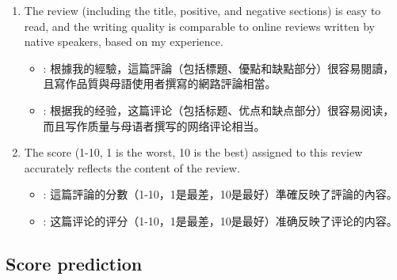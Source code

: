 \begin{enumerate}
    \item The review (including the title, positive, and negative sections) is easy to read, and the writing quality is comparable to online reviews written by native speakers, based on my experience.

    \begin{itemize}[leftmargin=*]
        \item \begin{CJK*}{UTF8}{bsmi} \twChinese:
        根據我的經驗，這篇評論（包括標題、優點和缺點部分）很容易閱讀，且寫作品質與母語使用者撰寫的網路評論相當。\end{CJK*}
    
        \item \begin{CJK*}{UTF8}{gbsn} \cnChinese:
        根据我的经验，这篇评论（包括标题、优点和缺点部分）很容易阅读，而且写作质量与母语者撰写的网络评论相当。\end{CJK*}
    
    \end{itemize}
    
    \item The score (1-10, 1 is the worst, 10 is the best) assigned to this review accurately reflects the content of the review.

    \begin{itemize}[leftmargin=*]
        \item \begin{CJK*}{UTF8}{bsmi} \twChinese:
        這篇評論的分數（1-10，1是最差，10是最好）準確反映了評論的內容。
        \end{CJK*}
        
        \item \begin{CJK*}{UTF8}{gbsn} \cnChinese:
        这篇评论的评分（1-10，1是最差，10是最好）准确反映了评论的内容。
        \end{CJK*}
    \end{itemize}
    
\end{enumerate}
\subsection{Score prediction}\label{app:human-prediction}

